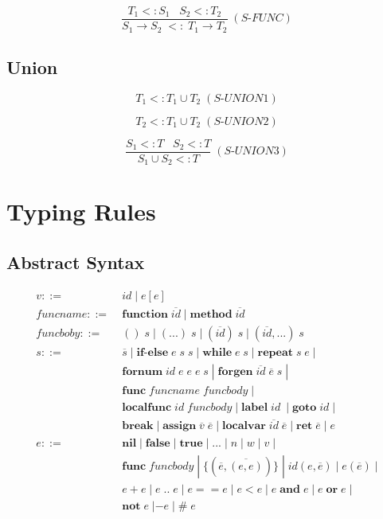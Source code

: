 \documentclass[12pt]{article}
\begin{document}
\[
\frac{T_{1} <: S_{1} \;\;\; S_{2} <: T_{2}}
     {S_{1} \rightarrow S_{2} \; <: \; T_{1} \rightarrow T_{2}} \;
(\textit{S-FUNC})
\]

\subsection{Union}

\[
T_{1} <: T_{1} \cup T_{2} \; (\textit{S-UNION1})
\]

\[
T_{2} <: T_{1} \cup T_{2} \; (\textit{S-UNION2})
\]

\[
\frac{S_{1} <: T\;\;\; S_{2} <: T}
     {S_{1} \cup S_{2} <: T} \; (\textit{S-UNION3})
\]

%

\section{Typing Rules}

\subsection{Abstract Syntax}

\begin{align*}
v ::= \; & id \; | \; e[e]\\
funcname ::= \; & \textbf{function} \; \overline{id} \;
| \; \textbf{method} \; \overline{id}\\
funcboby ::= \; & () \; s \; | \; ({...}) \; s \;
| \; (\overline{id}) \; s \; | \; (\overline{id},{...}) \; s\\
s ::= \; & \overline{s} \;
| \; \textbf{if-else} \; e \; s \; s \;
| \; \textbf{while} \; e \; s \;
| \; \textbf{repeat} \; s \; e \; | \\
& \textbf{fornum} \; id \; e \; e \; e \; s \; 
| \; \textbf{forgen} \; \overline{id} \; \overline{e} \; s \; | \\
& \textbf{func} \; funcname \; funcbody \; | \\
& \textbf{localfunc} \; id \; funcbody \;
| \; \textbf{label} \; id\ \; | \; \textbf{goto} \; id \; | \\
& \textbf{break} \;
| \; \textbf{assign} \; \overline{v} \; \overline{e} \;
| \; \textbf{localvar} \; \overline{id} \; \overline{e} \;
| \; \textbf{ret} \; \overline{e} \; | \; e\\
e ::= \; & \textbf{nil} \; | \; \textbf{false} \; | \; \textbf{true} \;
| \; {...} \; | \; n \; | \; w \; | \; v \; | \\
& \textbf{func} \; funcbody \;
| \; \{(\overline{e},\overline{(e,e)})\} \;
| \; id(e,\overline{e}) \; | \; e(\overline{e}) \; | \\
& e + e \; | \; e \; {..} \; e \; | \; e == e \; | \; e < e \;
| \; e \; \textbf{and} \; e \; | \; e \; \textbf{or} \; e \; | \\
& \textbf{not} \; e \; | - e \; | \; \# \; e
\end{align*}
\end{document}
